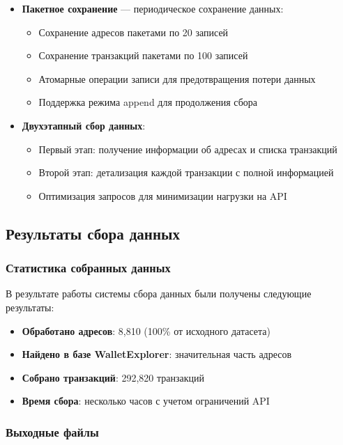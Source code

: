 \begin{itemize}
    \item \textbf{Пакетное сохранение} --- периодическое сохранение данных:
    \begin{itemize}
        \item Сохранение адресов пакетами по 20 записей
        \item Сохранение транзакций пакетами по 100 записей
        \item Атомарные операции записи для предотвращения потери данных
        \item Поддержка режима append для продолжения сбора
    \end{itemize}
    
    \item \textbf{Двухэтапный сбор данных}:
    \begin{itemize}
        \item Первый этап: получение информации об адресах и списка транзакций
        \item Второй этап: детализация каждой транзакции с полной информацией
        \item Оптимизация запросов для минимизации нагрузки на API
    \end{itemize}
\end{itemize}

\subsection{Результаты сбора данных}

\subsubsection{Статистика собранных данных}

В результате работы системы сбора данных были получены следующие результаты:

\begin{itemize}
    \item \textbf{Обработано адресов}: 8,810 (100\% от исходного датасета)
    \item \textbf{Найдено в базе WalletExplorer}: значительная часть адресов
    \item \textbf{Собрано транзакций}: 292,820 транзакций
    \item \textbf{Время сбора}: несколько часов с учетом ограничений API
\end{itemize}

\subsubsection{Выходные файлы}


